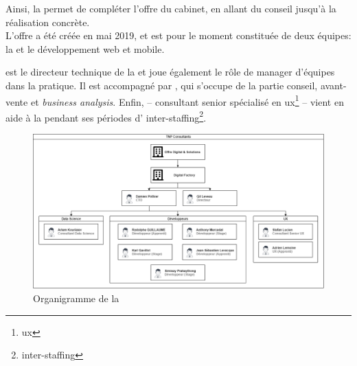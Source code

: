 Ainsi, la \df permet de compléter l'offre du cabinet, en allant du conseil jusqu'à la réalisation concrète.\\
L'offre a été créée en mai 2019, et est pour le moment constituée de deux équipes: la \ds et le développement web et mobile.


\damien est le directeur technique de la \df et joue également le rôle de manager d'équipes dans la pratique. Il est accompagné par \gil, qui s'occupe de la partie conseil, avant-vente et \textit{business analysis}. Enfin, \stefan -- consultant senior spécialisé en
\gls{ux}\footnote{\glsdesc{ux}}
-- vient en aide à la \df pendant ses périodes d'
\gls{inter-staffing}\footnote{\glsdesc{inter-staffing}}.


\begin{figure}[H]
    \centering
    \includegraphics[width=1\linewidth]{img/Organigramme.png}
    \caption{Organigramme de la \df}
\end{figure}